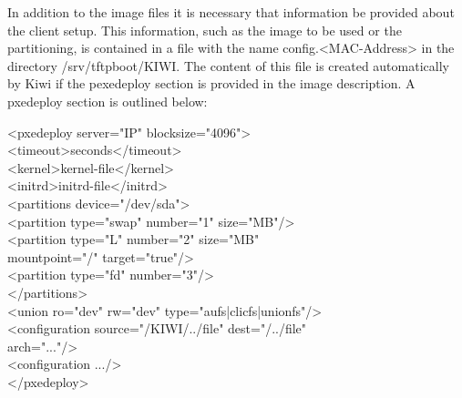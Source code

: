 \begin{itemize}
    In addition to the image files it is necessary that information be
    provided about the client setup. This information, such as the image
    to be used or the partitioning, is contained in a file with the name
    config.<MAC-Address> in the directory /srv/tftpboot/KIWI. The content
    of this file is created automatically by Kiwi if the pexedeploy section
    is provided in the image description. A pxedeploy section is outlined
    below:
	
	\begin{Command}{14cm}
	<pxedeploy server="IP" blocksize="4096">\\
	\hspace*{1cm}<timeout>seconds</timeout>\\
	\hspace*{1cm}<kernel>kernel-file</kernel>\\
	\hspace*{1cm}<initrd>initrd-file</initrd>\\
	\hspace*{1cm}<partitions device="/dev/sda">\\
	\hspace*{2cm}<partition type="swap" number="1" size="MB"/>\\
	\hspace*{2cm}<partition type="L" number="2" size="MB"\\
	\hspace*{4.5cm}mountpoint="/" target="true"/>\\
	\hspace*{2cm}<partition type="fd" number="3"/>\\
	\hspace*{1cm}</partitions>\\
	\hspace*{1cm}<union ro="dev" rw="dev" type="aufs|clicfs|unionfs"/>\\
	\hspace*{1cm}<configuration source="/KIWI/../file" dest="/../file"\\
	\hspace*{4.5cm}arch="..."/>\\
	\hspace*{1cm}<configuration .../>\\
	</pxedeploy>
	\end{Command}


\end{itemize}
